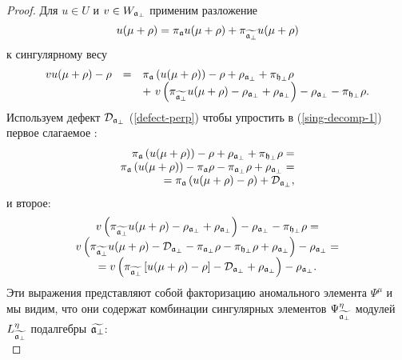 \begin{proof}
Для $u\in U $ и $v\in W_{\mathfrak{a}_{\perp}}$ применим разложение
\begin{equation*}
u(\mu +\rho )=\pi _{\mathfrak{a} } u(\mu +\rho )+\pi _{
\widetilde{\mathfrak{a}_{\perp }} } u(\mu +\rho )
\end{equation*}
к сингулярному весу
\begin{equation}
\label{sing-decomp-1}
\begin{array}{lcl}
vu(\mu +\rho )-\rho &=&\pi _{ \af }\left( u(\mu +\rho
)\right) -\rho +\rho _{\af_{\perp }}+\pi _{ \hfb }\rho \\
&& + \ v\left( \pi _{ \widetilde{%
\af_{\perp }} }u(\mu +\rho )-\rho _{\af_{\perp }}+\rho _{%
\af_{\perp }}\right) -\rho _{\af_{\perp }} -\pi _{ \hfb }\rho.
\end{array}
\end{equation}
Используем дефект $\mathcal{D}_{\mathfrak{a}_{\perp}}$ (\ref{defect-perp}) чтобы упростить в (\ref{sing-decomp-1}) первое слагаемое :
\begin{equation*}
\begin{array}{r}
\pi _{ \af }\left( u(\mu +\rho )\right) -\rho +\rho _{%
\mathfrak{a}_{\perp }}+\pi _{ \hfb }\rho = \\
\pi _{ \af }\left( u(\mu +\rho )\right) -\pi _{\af}\rho
-\pi _{\afb}\rho +\rho _{\afb}= \\
=\pi _{ \af }\left( u(\mu +\rho )-\rho \right) +%
\mathcal{D}_{\afb},
\end{array}
\end{equation*}
и второе:
\begin{equation*}
\begin{array}{c}
v\left( \pi _{ \widetilde{%
\af_{\perp }} }u(\mu +\rho )-\rho _{\af_{\perp }}+\rho _{%
\af_{\perp }}\right) -\rho _{\af_{\perp }}-\pi _{ \hfb }\rho=\\
v\left( \pi _{ \widetilde{%
\afb} }u(\mu +\rho )
- \mathcal{D}_{\afb} - \pi _{ \afb }\rho-\pi _{ \hfb }\rho
+\rho _{\afb}\right) -\rho _{\afb}=\\
=v\left( \pi _{ \widetilde{%
\afb} }\left[ u(\mu +\rho )-\rho\right]
- \mathcal{D}_{\afb}
+\rho _{\afb}\right) -\rho _{\afb}.
\end{array}
\end{equation*}
Эти выражения представляют собой факторизацию аномального элемента  $\Psi^{\mu}$ и мы видим, что они содержат комбинации сингулярных элементов $\Psi _{\widetilde{\mathfrak{a}_{\perp }}}^{\eta }$ модулей $L_{\widetilde{\mathfrak{a}_{\perp}}}^{\eta }$ подалгебры  $\widetilde{\mathfrak{a}_{\perp}}$:
\begin{equation*}

\end{equation*}
\end{proof}
